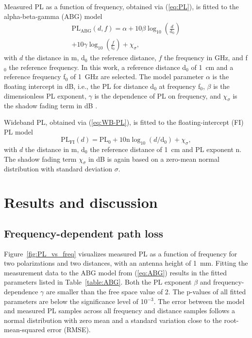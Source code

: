 \documentclass[preprint]{rsl}
\begin{document}
Measured PL as a function of frequency, obtained via (\ref{eq:PL}), is fitted to the alpha-beta-gamma (ABG) model
\begin{multline}
  \text{PL}_{\text{ABG}}(d,f) = \alpha + 10 \beta \log_{10}\left(\frac{d}{\text{d}_0}\right) \\ + 10 \gamma \log_{10}\left(\frac{f}{ \text{f}_0}\right) + \chi_{\sigma},
  \label{eq:ABG}
\end{multline}
with $d$ the distance in m, d$_0$ the reference distance, $f$ the frequency in GHz, and f$_0$ the reference frequency.  
In this work, a reference distance d$_0$ of 1~cm and a reference frequency f$_0$ of 1~GHz are selected.
The model parameter $\alpha$ is the floating intercept in dB, i.e., the PL for distance d$_0$ at frequency f$_0$, $\beta$ is the dimensionless PL exponent, $\gamma$ is the dependence of PL on frequency, and $\chi_{\sigma}$ is the shadow fading term in dB \cite{Salous2020}. 

Wideband PL, obtained via (\ref{eq:WB-PL}), is fitted to the floating-intercept (FI) PL model 
\begin{equation}
  \text{PL}_{\text{FI}}(d) = \text{PL}_0 + 10 \text{n} \log_{10} (d/\text{d}_0) + \chi_\sigma, 
  \label{eq:FI}
\end{equation}
with $d$ the distance in m, d$_0$ the reference distance of 1~cm and PL exponent n. 
The shadow fading term $\chi_\sigma$ in dB is again based on a zero-mean normal distribution with standard deviation $\sigma$. 

\section{Results and discussion\label{sect:results}}

\subsection{Frequency-dependent path loss}

Figure~\ref{fig:PL_vs_freq} visualizes measured PL as a function of frequency for two polarizations and two distances, with an antenna height of 1~mm.
Fitting the measurement data to the ABG model from (\ref{eq:ABG}) results in the fitted parameters listed in Table~\ref{table:ABG}. 
Both the PL exponent $\beta$ and frequency-dependence $\gamma$ are smaller than the free space value of 2. 
The p-values of all fitted parameters are below the significance level of 10$^{-3}$. 
The error between the model and measured PL samples across all frequency and distance samples follows a normal distribution with zero mean and a standard variation close to the root-mean-squared error (RMSE). 
\end{document}
